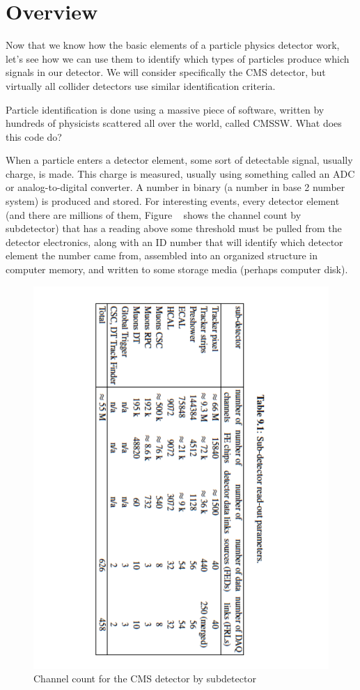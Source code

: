 \section{Overview}
Now that we know how the basic elements of a particle physics detector work, let's see how we can use them to identify which types of particles produce which signals in our detector.  
We will consider specifically the CMS detector, but virtually all collider detectors use similar identification criteria.

Particle identification is done using a massive piece of software, written by hundreds of physicists scattered all over the world, called CMSSW.  What does this code do?

When a particle enters a detector element, some sort of detectable signal, usually charge, is made.  This charge is measured, usually using something called an ADC or analog-to-digital converter.  A number in binary (a number in base 2 number system) is produced and stored. For interesting events, every detector element (and there are millions of them, Figure ~\cite{fig:count} shows the channel count by subdetector) that has a reading above some threshold must be pulled from the detector electronics, along with an ID number that will identify which detector element the number came from, assembled into an organized structure in computer memory, and written to some storage media (perhaps computer disk).  

\begin{figure}[h]
\centering\includegraphics[scale=0.6,angle=90]{./particleID/Pictures/channelcount.pdf}
\caption{Channel count for the CMS detector by subdetector}
\label{fig:count}
\end{figure} 

